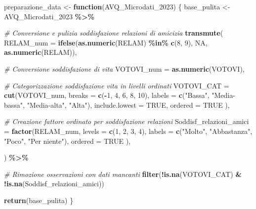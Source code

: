 \documentclass[
]{article}
\newenvironment{Shaded}{\begin{snugshade}}{\end{snugshade}}
\newcommand{\AttributeTok}[1]{\textcolor[rgb]{0.13,0.29,0.53}{#1}}
\newcommand{\CommentTok}[1]{\textcolor[rgb]{0.56,0.35,0.01}{\textit{#1}}}
\newcommand{\ConstantTok}[1]{\textcolor[rgb]{0.56,0.35,0.01}{#1}}
\newcommand{\ControlFlowTok}[1]{\textcolor[rgb]{0.13,0.29,0.53}{\textbf{#1}}}
\newcommand{\DecValTok}[1]{\textcolor[rgb]{0.00,0.00,0.81}{#1}}
\newcommand{\FunctionTok}[1]{\textcolor[rgb]{0.13,0.29,0.53}{\textbf{#1}}}
\newcommand{\NormalTok}[1]{#1}
\newcommand{\OtherTok}[1]{\textcolor[rgb]{0.56,0.35,0.01}{#1}}
\newcommand{\SpecialCharTok}[1]{\textcolor[rgb]{0.81,0.36,0.00}{\textbf{#1}}}
\newcommand{\StringTok}[1]{\textcolor[rgb]{0.31,0.60,0.02}{#1}}
\begin{document}
\begin{Shaded}
\begin{Highlighting}[]
\NormalTok{preparazione\_data }\OtherTok{\textless{}{-}} \ControlFlowTok{function}\NormalTok{(AVQ\_Microdati\_2023) \{}
\NormalTok{  base\_pulita }\OtherTok{\textless{}{-}}\NormalTok{ AVQ\_Microdati\_2023 }\SpecialCharTok{\%\textgreater{}\%}
    
    \CommentTok{\# Conversione e pulizia soddisfazione relazioni di amicizia}
    \FunctionTok{transmute}\NormalTok{(}
      \AttributeTok{RELAM\_num =} \FunctionTok{ifelse}\NormalTok{(}\FunctionTok{as.numeric}\NormalTok{(RELAM) }\SpecialCharTok{\%in\%} \FunctionTok{c}\NormalTok{(}\DecValTok{8}\NormalTok{, }\DecValTok{9}\NormalTok{), }\ConstantTok{NA}\NormalTok{, }\FunctionTok{as.numeric}\NormalTok{(RELAM)),}
      
      \CommentTok{\# Conversione soddisfazione di vita}
      \AttributeTok{VOTOVI\_num =} \FunctionTok{as.numeric}\NormalTok{(VOTOVI),}
      
      \CommentTok{\# Categorizzazione soddisfazione vita in livelli ordinati}
      \AttributeTok{VOTOVI\_CAT =} \FunctionTok{cut}\NormalTok{(VOTOVI\_num, }
                       \AttributeTok{breaks =} \FunctionTok{c}\NormalTok{(}\SpecialCharTok{{-}}\DecValTok{1}\NormalTok{, }\DecValTok{4}\NormalTok{, }\DecValTok{6}\NormalTok{, }\DecValTok{8}\NormalTok{, }\DecValTok{10}\NormalTok{), }
                       \AttributeTok{labels =} \FunctionTok{c}\NormalTok{(}\StringTok{"Bassa"}\NormalTok{, }\StringTok{"Media{-}bassa"}\NormalTok{, }\StringTok{"Media{-}alta"}\NormalTok{, }\StringTok{"Alta"}\NormalTok{),}
                       \AttributeTok{include.lowest =} \ConstantTok{TRUE}\NormalTok{,}
                       \AttributeTok{ordered =} \ConstantTok{TRUE}
\NormalTok{                       ),}
      
      \CommentTok{\# Creazione fattore ordinato per soddisfazione relazioni}
      \AttributeTok{Soddisf\_relazioni\_amici =} \FunctionTok{factor}\NormalTok{(RELAM\_num,}
                                     \AttributeTok{levels =} \FunctionTok{c}\NormalTok{(}\DecValTok{1}\NormalTok{, }\DecValTok{2}\NormalTok{, }\DecValTok{3}\NormalTok{, }\DecValTok{4}\NormalTok{),}
                                     \AttributeTok{labels =} \FunctionTok{c}\NormalTok{(}\StringTok{"Molto"}\NormalTok{, }\StringTok{"Abbastanza"}\NormalTok{, }\StringTok{"Poco"}\NormalTok{, }\StringTok{"Per niente"}\NormalTok{),}
                                     \AttributeTok{ordered =} \ConstantTok{TRUE}
\NormalTok{                                     ),}

\NormalTok{    ) }\SpecialCharTok{\%\textgreater{}\%}
    
    \CommentTok{\# Rimozione osservazioni con dati mancanti}
    \FunctionTok{filter}\NormalTok{(}\SpecialCharTok{!}\FunctionTok{is.na}\NormalTok{(VOTOVI\_CAT) }\SpecialCharTok{\&} \SpecialCharTok{!}\FunctionTok{is.na}\NormalTok{(Soddisf\_relazioni\_amici))}
  
  \FunctionTok{return}\NormalTok{(base\_pulita)}
\NormalTok{\}}
\end{Highlighting}
\end{Shaded}
\end{document}
